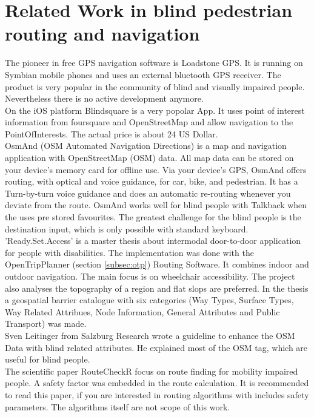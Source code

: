 \documentclass{sig-alternate}
\begin{document}
\section{Related Work in blind pedestrian routing and navigation}
The pioneer in free GPS navigation software is Loadstone GPS\cite{loadstone}. It is running on Symbian mobile phones and uses an external bluetooth GPS receiver. The product is very popular in the community of blind and visually impaired people. Nevertheless there is no active development anymore. \\
On the iOS platform Blindsquare\cite{blindsquare} is a very popolar App. It uses point of interest information from foursquare and OpenStreetMap and allow navigation to the PointOfInterests. The actual price is about 24 US Dollar. \\
OsmAnd (OSM Automated Navigation Directions) is a map and navigation application with OpenStreetMap (OSM) data. All map data can be stored on your device's memory card for offline use. Via your device's GPS, OsmAnd offers routing, with optical and voice guidance, for car, bike, and pedestrian. It has a Turn-by-turn voice guidance and does an automatic re-routing whenever you deviate from the route. OsmAnd works well for blind people with Talkback when the uses pre stored favourites. The greatest challenge for the blind people is the destination input, which is only possible with standard keyboard.  \\
'Ready.Set.Access'\cite{weyrer} is a master thesis about intermodal door-to-door application for people with disabilities. The implementation was done with the OpenTripPlanner (section \ref{subsec:otp}) Routing Software. It combines indoor and outdoor navigation. The main focus is on wheelchair accessibility. The project also analyses the topography of a region and flat slops are preferred. In the thesis a geospatial barrier catalogue with six categories (Way Types, Surface Types, Way Related Attribues, Node Information, General Attributes and Public Transport) was made. \\
Sven Leitinger\cite{sven:osm} from Salzburg Research wrote a guideline to enhance the OSM Data with blind related attributes. He explained most of the OSM tag, which are useful for blind people. \\
The scientific paper\cite{Volkel:2008} RouteCheckR focus on route finding for mobility impaired people. A safety factor was embedded in the route calculation. It is recommended to read this paper, if you are interested in routing algorithms with includes safety parameters. The algorithms itself are not scope of this work.  
\end{document}

